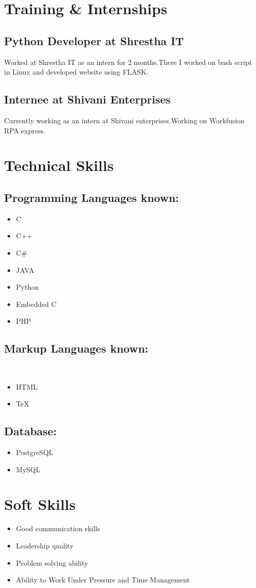 \documentclass{article}
\begin{document}
	\section{Training \& Internships}
			\subsection{Python Developer at Shrestha IT}
			Worked at Shrestha IT as an intern for 2 months.There I worked on bash script in Linux and developed website using FLASK. 
			\subsection{Internee at Shivani Enterprises}
			Currently working as an intern at Shivani enterprises.Working on Workfusion RPA express.
	\section{Technical Skills}
			\subsection{Programming Languages known:}
			\begin{itemize}
				\item C
				\item C++
				\item C\#
				\item JAVA
				\item Python
				\item Embedded C
				\item PHP
			\end{itemize}
			\subsection{Markup Languages known:}\
			\begin{itemize}
				\item HTML
				\item TeX
			\end{itemize}
			\subsection{Database:}
			\begin{itemize}
				\item PostgreSQL
				\item MySQL
			\end{itemize}
		\section{Soft Skills}
		\begin{itemize}
			\item Good communication skills
			\item Leadership quality
			\item Problem solving ability
			\item Ability to Work Under Pressure and Time Management
		\end{itemize}
\end{document}
